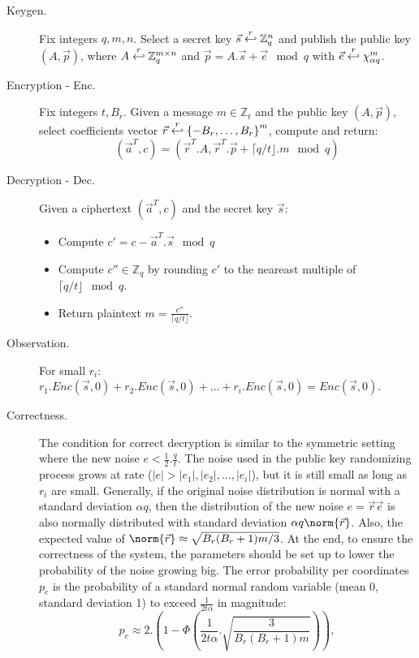 \begin{description}
\item [Keygen.] Fix integers $q, m, n$. Select a secret key
  $\vec{s} \stackrel{r}{\hookleftarrow} \mathbb{Z}_q^n$ and publish the public key
  $(A,\vec{p})$, where $A \stackrel{r}{\hookleftarrow} \mathbb{Z}_q^{m \times n}$ and
  $\vec{p} = A.\vec{s} + \vec{e} \mod q$ with
  $\vec{e} \stackrel{r}{\hookleftarrow} \chi_{\alpha q}^m$.
\item [Encryption - Enc.] Fix integers $t, B_r$. Given a message
  $m \in \mathbb{Z}_t$ and the public key $(A,\vec{p})$, select coefficients
  vector $\vec{r} \stackrel{r}{\hookleftarrow} \left\{ -B_r, \dots, B_r \right\}^m$, compute
  and return:
  \[
    (\vec{a}^T, c) = ( \vec{r}^T . A, \vec{r}^T .  \vec{p} + \lceil q/t \rfloor
    . m \mod q)
  \]
\item [Decryption - Dec.] Given a ciphertext $(\vec{a}^T, c)$ and the secret key
  $\vec{s}$:
  \begin{itemize}
  \item Compute $c' = c - \vec{a}^T . \vec{s} \mod q$
  \item Compute $c'' \in \mathbb{Z}_q$ by rounding $c'$ to the neareast multiple
    of $\lceil q/t \rfloor \mod q$.
  \item Return plaintext $m = \frac{c''}{\lceil q/t \rfloor}$.
  \end{itemize}
\item [Observation.] For small $r_i$:
  $r_1.Enc(\vec{s},0) + r_2.Enc(\vec{s}, 0) + \dots + r_i.Enc(\vec{s},0) =
  Enc(\vec{s}, 0)$.
\item [Correctness.] The condition for correct decryption is similar to the
  symmetric setting where the new noise $e < \frac{1}{2}. \frac{q}{t}$. The
  noise used in the public key randomizing process grows at rate
  ($|e| > |e_1|, |e_2|,\dots,|e_i|$), but it is still small as long as $r_i$ are
  small. Generally, if the original noise distribution is normal with a standard
  deviation $\alpha q$, then the distribution of the new noise
  $e = \vec{r}\vec{e}$ is also normally distributed with standard deviation
  $\alpha q \norm{\vec{r}}$. Also, the expected value of
  $\norm{\vec{r}} \approx \sqrt{B_r(B_r + 1)m/3}$. At the end, to ensure the
  correctness of the system, the parameters should be set up to lower the
  probability of the noise growing big. The error probability per
  coordinates $p_e$ is the probability of a standard normal random variable
  (mean 0, standard deviation 1) to exceed $\frac{1}{2t\alpha}$ in magnitude:
  \[
    p_e \approx 2 . \left( 1 - \Phi\left(
        \frac{1}{2t\alpha}.\sqrt{\frac{3}{B_r(B_r+1)m}} \right) \right),
\]
\end{description}
